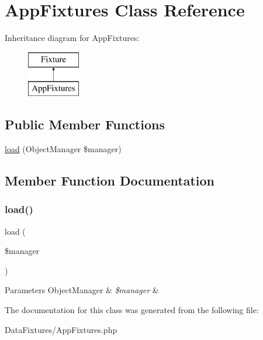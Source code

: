 \hypertarget{class_app_1_1_data_fixtures_1_1_app_fixtures}{}\section{App\+Fixtures Class Reference}
\label{class_app_1_1_data_fixtures_1_1_app_fixtures}
Inheritance diagram for App\+Fixtures\+:\begin{figure}[H]
\begin{center}
\leavevmode
\includegraphics[height=2.000000cm]{class_app_1_1_data_fixtures_1_1_app_fixtures}
\end{center}
\end{figure}
\subsection*{Public Member Functions}
\begin{DoxyCompactItemize}
\item 
\mbox{\hyperlink{class_app_1_1_data_fixtures_1_1_app_fixtures_acb7929747e63056fbc9e2892615c18b2}{load}} (Object\+Manager \$manager)
\end{DoxyCompactItemize}


\subsection{Member Function Documentation}
\mbox{\label{class_app_1_1_data_fixtures_1_1_app_fixtures_acb7929747e63056fbc9e2892615c18b2}} 
\subsubsection{\texorpdfstring{load()}{load()}}
{\footnotesize\ttfamily load (\begin{DoxyParamCaption}\item[{Object\+Manager}]{\$manager }\end{DoxyParamCaption})}


\begin{DoxyParams}[1]{Parameters}
Object\+Manager & {\em \$manager} & \\
\hline
\end{DoxyParams}


The documentation for this class was generated from the following file\+:\begin{DoxyCompactItemize}
\item 
Data\+Fixtures/App\+Fixtures.\+php\end{DoxyCompactItemize}
